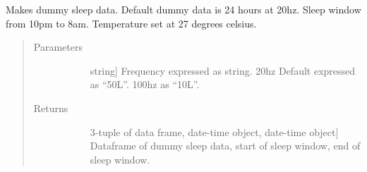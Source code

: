 \documentclass[letterpaper,10pt,english]{sphinxmanual}
\begin{document}
\begin{fulllineitems}
\label{\detokenize{index:sleeppy.utils.make_dummy_data}}
Makes dummy sleep data. Default dummy data is 24 hours at 20hz. Sleep window from 10pm to 8am. Temperature set at 27
degrees celsius.
\begin{quote}\begin{description}
\item[{Parameters}] \leavevmode\begin{description}
\item[{}] \leavevmode{[}string{]}
Frequency expressed as string. 20hz Default expressed as “50L”. 100hz as “10L”.

\end{description}

\item[{Returns}] \leavevmode\begin{description}
\item[{}] \leavevmode{[}3-tuple of data frame, date-time object, date-time object{]}
Dataframe of dummy sleep data, start of sleep window, end of sleep window.

\end{description}

\end{description}\end{quote}

\end{fulllineitems}

\end{document}
